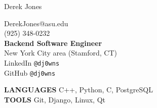 \documentclass[10pt,oneside]{article}
\makeatletter
\newcommand{\name}{Derek Jones}
\newcommand{\cellphone}{(925) 348-0232}
\newcommand{\email}{DerekJones@asu.edu}
\newcommand{\github}{GitHub \texttt{@dj0wns}}
\newcommand{\linkedin}{LinkedIn \texttt{@dj0wns}}
\newcommand{\languages}{C++, Python, C, PostgreSQL}
\newcommand{\tools}{Git, Django, Linux, Qt}
\newcommand{\bigname}[1]{
  \begin{center}\huge#1\end{center}
}
\makeatother
\begin{document}
 \selectfont

\bigname{\name}
\vspace{-0pt}
\begin{flushleft}
 \begin{multicols}{3}
  \email \\
  \cellphone \\
  \centering \textbf{Backend Software Engineer} \\
  \centering New York City area (Stamford, CT) \\
  \hfill\linkedin \\
  \hfill\github \\
 \end{multicols}
\end{flushleft}

\begin{center}
 \begin{multicols}{2}
  \textbf{\uppercase{Languages}} \languages \\
  \textbf{\uppercase{Tools}} \tools \\
 \end{multicols}
\end{center}

\vspace{-5 pt}
\end{document}

